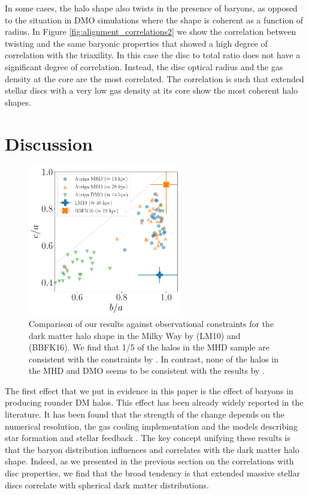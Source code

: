 \documentclass[usenatbib]{mnras}
\begin{document}
In some cases, the halo shape also twists in the presence of baryons, as opposed to
the situation in DMO simulations where the shape is coherent as a
function of radius.
In Figure \ref{fig:alignment_correlations2} we show the correlation
between twisting and the same baryonic properties that showed a high
degree of correlation with the triaxility.
In this case the disc to total ratio does not have a significant
degree of correlation.
Instead, the disc optical radius and the gas density at the core are
the most correlated. 
The correlation is such that extended stellar discs with a very low
gas density at its core show the most coherent halo shapes.  


\section{Discussion}
\label{sec:discussion}

\begin{figure}
\begin{center}
\includegraphics[width=0.6\textwidth]{triaxiality_observations.pdf}
\end{center}
\caption{Comparison of our results against 
observational constraints for the 
dark matter halo shape in the Milky Way by \citet{LM10} (LM10) and
\citet{Bovy16} (BBFK16).   
We find that  1/5 of the halos in the MHD  sample are consistent with
the constraints by \citet{Bovy16}.
In contrast, none of the halos in the MHD and DMO seems to be
consistent with the results by \citet{LM10}.}
\label{fig:observations}
\end{figure}



The first effect that we put in evidence in this paper is the effect
of baryons in producing rounder DM halos.
This effect has been already widely reported in the literature.
It has been found that the strength of the change depends on the
numerical resolution, the gas cooling implementation and the
models describing star formation and stellar feedback
\citep{Bailin05,Debattista08, Bryan13, Butsky16, Chua19, Artale19}.  
The key concept unifying these results is that the baryon distribution
influences and correlates with the dark matter halo shape. 
Indeed, as we presented in the previous section on the correlations
with disc properties, we find that the broad tendency is that extended
massive stellar discs correlate with spherical dark matter
distributions.  
\end{document}
